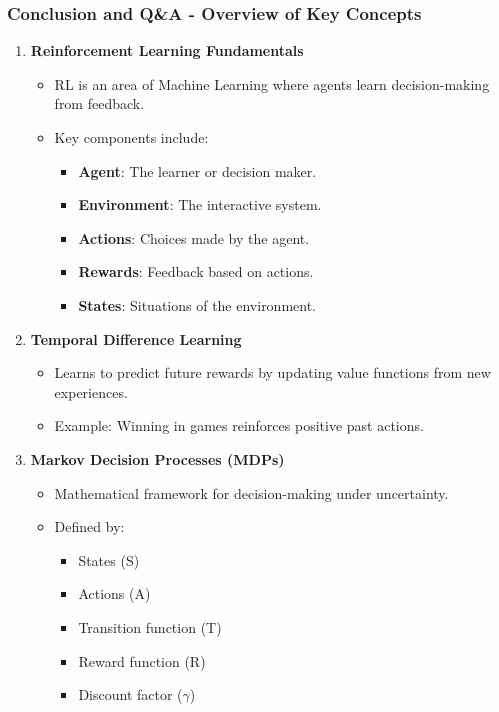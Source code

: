 \documentclass[aspectratio=169]{beamer}
\begin{document}
\begin{frame}[fragile]
    \frametitle{Conclusion and Q\&A - Overview of Key Concepts}
    \begin{enumerate}
        \item \textbf{Reinforcement Learning Fundamentals}
            \begin{itemize}
                \item RL is an area of Machine Learning where agents learn decision-making from feedback.
                \item Key components include:
                    \begin{itemize}
                        \item \textbf{Agent}: The learner or decision maker.
                        \item \textbf{Environment}: The interactive system.
                        \item \textbf{Actions}: Choices made by the agent.
                        \item \textbf{Rewards}: Feedback based on actions.
                        \item \textbf{States}: Situations of the environment.
                    \end{itemize}
            \end{itemize}
        
        \item \textbf{Temporal Difference Learning}
            \begin{itemize}
                \item Learns to predict future rewards by updating value functions from new experiences.
                \item Example: Winning in games reinforces positive past actions.
            \end{itemize}
        
        \item \textbf{Markov Decision Processes (MDPs)}
            \begin{itemize}
                \item Mathematical framework for decision-making under uncertainty.
                \item Defined by:
                    \begin{itemize}
                        \item States (S)
                        \item Actions (A)
                        \item Transition function (T)
                        \item Reward function (R)
                        \item Discount factor ($\gamma$)
                    \end{itemize}
            \end{itemize}
    \end{enumerate}
\end{frame}
\end{document}

